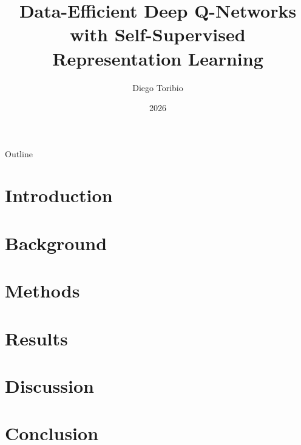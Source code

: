 \documentclass[aspectratio=169]{beamer}
\title{Data-Efficient Deep Q-Networks with Self-Supervised
       Representation Learning}
\author{Diego Toribio}
\date{2026}
\begin{document}
\maketitle

\begin{frame}{Outline}
  \tableofcontents
\end{frame}

\section{Introduction}

\section{Background}

\section{Methods}

\section{Results}

\section{Discussion}

\section{Conclusion}
\end{document}
